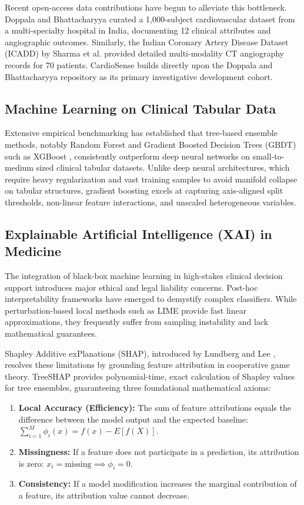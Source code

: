 \documentclass[conference]{IEEEtran}
\begin{document}
Recent open-access data contributions have begun to alleviate this bottleneck. Doppala and Bhattacharyya \cite{mendeleyindia} curated a 1,000-subject cardiovascular dataset from a multi-specialty hospital in India, documenting 12 clinical attributes and angiographic outcomes. Similarly, the Indian Coronary Artery Disease Dataset (ICADD) by Sharma et al. \cite{icadd} provided detailed multi-modality CT angiography records for 70 patients. CardioSense builds directly upon the Doppala and Bhattacharyya repository as its primary investigative development cohort.

\subsection{Machine Learning on Clinical Tabular Data}
Extensive empirical benchmarking has established that tree-based ensemble methods, notably Random Forest \cite{breiman2001} and Gradient Boosted Decision Trees (GBDT) such as XGBoost \cite{chen2016}, consistently outperform deep neural networks on small-to-medium sized clinical tabular datasets. Unlike deep neural architectures, which require heavy regularization and vast training samples to avoid manifold collapse on tabular structures, gradient boosting excels at capturing axis-aligned split thresholds, non-linear feature interactions, and unscaled heterogeneous variables.

\subsection{Explainable Artificial Intelligence (XAI) in Medicine}
The integration of black-box machine learning in high-stakes clinical decision support introduces major ethical and legal liability concerns. Post-hoc interpretability frameworks have emerged to demystify complex classifiers. While perturbation-based local methods such as LIME provide fast linear approximations, they frequently suffer from sampling instability and lack mathematical guarantees. 

Shapley Additive exPlanations (SHAP), introduced by Lundberg and Lee \cite{lundberg2017}, resolves these limitations by grounding feature attribution in cooperative game theory. TreeSHAP provides polynomial-time, exact calculation of Shapley values for tree ensembles, guaranteeing three foundational mathematical axioms:
\begin{enumerate}
    \item \textbf{Local Accuracy (Efficiency):} The sum of feature attributions equals the difference between the model output and the expected baseline: $\sum_{i=1}^M \phi_i(x) = f(x) - E[f(X)]$.
    \item \textbf{Missingness:} If a feature does not participate in a prediction, its attribution is zero: $x_i = \text{missing} \implies \phi_i = 0$.
    \item \textbf{Consistency:} If a model modification increases the marginal contribution of a feature, its attribution value cannot decrease.
\end{enumerate}
\end{document}
